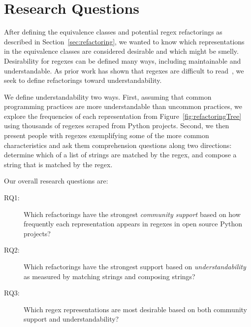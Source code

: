 






\section{Research Questions}
\label{sec:study}
After defining the equivalence classes and potential  regex refactorings as described in Section~\ref{sec:refactoring}, we wanted to know which representations in the equivalence classes  are considered desirable and which might be smelly. Desirability for regexes can be defined many ways, including maintainable and understandable. As prior work has shown that regexes are difficult to read~\cite{}, we seek to define refactorings toward understandability.

We define understandability two ways. First, assuming that common programming practices are more understandable than uncommon practices, we explore the frequencies of each representation from Figure~\ref{fig:refactoringTree} using thousands of regexes scraped from Python projects. Second, we then present people with regexes exemplifying some of the more common characteristics and ask them comprehension questions along two directions: determine which of a list of strings are matched by the regex, and compose a string that is matched by the regex.

Our overall research questions are:
\begin{description}
\item[RQ1:] Which refactorings have the strongest \emph{community support} based on how frequently each representation appears in regexes in open source Python projects?
\item[RQ2:] Which refactorings have the strongest support based on \emph{understandability} as measured by matching strings and composing strings?
\item[RQ3:] Which regex representations are most desirable based on both community support and understandability?
\end{description}



